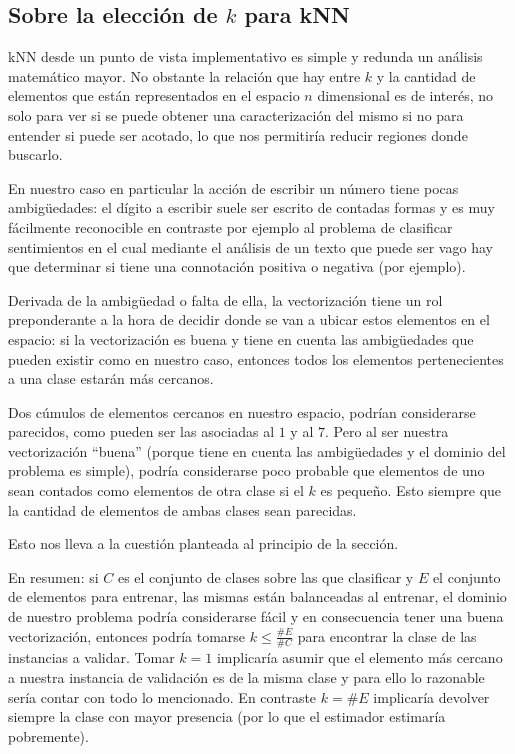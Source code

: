 \subsection{Sobre la elección de $k$ para kNN}

kNN desde un punto de vista implementativo es simple y redunda un análisis matemático mayor. No obstante la relación que hay entre $k$ y la cantidad de elementos que están representados en el espacio $n$ dimensional es de interés, no solo para ver si se puede obtener una caracterización del mismo si no para entender si puede ser acotado, lo que nos permitiría reducir regiones donde buscarlo.

En nuestro caso en particular la acción de escribir un número tiene pocas ambigüedades: el dígito a escribir suele ser escrito de contadas formas y es muy fácilmente reconocible en contraste por ejemplo al problema de clasificar sentimientos en el cual mediante el análisis de un texto que puede ser vago hay que determinar si tiene una connotación positiva o negativa (por ejemplo).

Derivada de la ambigüedad o falta de ella, la vectorización tiene un rol preponderante a la hora de decidir donde se van a ubicar estos elementos en el espacio: si la vectorización es buena y tiene en cuenta las ambigüedades que pueden existir como en nuestro caso, entonces todos los elementos pertenecientes a una clase estarán más cercanos.

Dos cúmulos de elementos cercanos en nuestro espacio, podrían considerarse parecidos, como pueden ser las asociadas al $1$ y al $7$. Pero al ser nuestra vectorización ``buena'' (porque tiene en cuenta las ambigüedades y el dominio del problema es simple), podría considerarse poco probable que elementos de uno sean contados como elementos de otra clase si el $k$ es pequeño. Esto siempre que la cantidad de elementos de ambas clases sean parecidas.

Esto nos lleva a la cuestión planteada al principio de la sección.

En resumen: si $C$ es el conjunto de clases sobre las que clasificar y $E$ el conjunto de elementos para entrenar, las mismas están balanceadas al entrenar, el dominio de nuestro problema podría considerarse fácil y en consecuencia tener una buena vectorización, entonces podría tomarse $k\leq\frac{\#E}{\#C}$ para encontrar la clase de las instancias a validar. Tomar $k=1$ implicaría asumir que el elemento más cercano a nuestra instancia de validación es de la misma clase y para ello lo razonable sería contar con todo lo mencionado. En contraste $k=\#E$  implicaría devolver siempre la clase con mayor presencia (por lo que el estimador estimaría pobremente).

